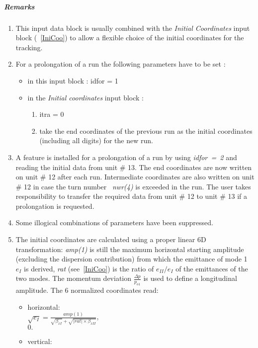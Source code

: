 \documentclass[a4paper,11pt]{report}
\begin{document}
\subparagraph{Remarks}
\begin{enumerate}
\item This input data block is usually combined with the {\em Initial
    Coordinates} \/input block (~\ref{IniCoo}) to allow a flexible
  choice of the initial coordinates for the tracking.
\item For a prolongation of a run the following parameters have to be
  set :
\begin{itemize}
\item in this input block : idfor = 1
\item in the {\em Initial coordinates} \/input block :
\begin{enumerate}
\item itra = 0
\item take the end coordinates of the previous run as the initial
  coordinates (including all digits) for the new run.
\end{enumerate}
\end{itemize}
\item A feature is installed for a prolongation of a run by using
  \mbox{\em idfor = 2} \/and 
  reading the initial data from unit \# 13. The end coordinates are
  now written on unit \# 12 after each run. Intermediate coordinates
  are also written on unit \# 12 in case the turn number \mbox{\em
    nwr(4)} \/is exceeded in the run. The user takes responsibility to
  transfer the required data from unit \# 12 to unit \# 13 if a
  prolongation is requested.
\item Some illogical combinations of parameters have been suppressed.
\item The initial coordinates are calculated using a proper linear 6D
  transformation: {\em amp(1)} \/is still the maximum horizontal
  starting amplitude (excluding the dispersion contribution) from
  which the emittance of mode 1 $e_I$ is derived, {\em rat}
  \/(see~\ref{IniCoo}) is the ratio of $e_{II}/e_I$ of the emittances
  of the two modes. The momentum deviation $\frac{\Delta p}{p_{o1}}$ is used to
  define a longitudinal amplitude. The 6 normalized coordinates read:
\begin{itemize}
\item horizontal:\\

  $\sqrt{e_I}=\frac{amp(1)}
  {\sqrt{\beta_{xI}}+\sqrt{\left|rat\right|\times\beta_{xII}}}$,\\

  $0.$

\item vertical: \\


\end{itemize}
\end{enumerate}
\end{document}
